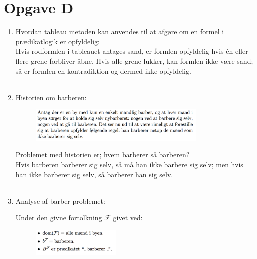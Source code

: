 \section*{Opgave D}

\begin{enumerate}
    \item Hvordan tableau metoden kan anvendes til at afgøre om en formel i prædikatlogik er opfyldelig: \\
    
    Hvis rodformlen i tableauet antages sand, er formlen opfyldelig hvis én eller flere grene forbliver åbne. Hvis alle grene lukker, kan formlen ikke være sand; så er formlen en kontradiktion og dermed ikke opfyldelig.\\
    \\
    
    \item Historien om barberen:
    
    \begin{figure}[H]
        \centering
        \includegraphics[width=0.8\textwidth]{opgD/barber.png}
        \label{fig:barber}
    \end{figure}
    
    Problemet med historien er; hvem barberer så barberen? \\
    Hvis barberen barberer sig selv, så må han ikke barbere sig selv; men hvis han ikke barberer sig selv, så barberer han sig selv.\\
    \\
    
    \item Analyse af barber problemet:
    
    Under den givne fortolkning $\mathcal{F}$ givet ved:
    
    \begin{figure}[H]
        \hspace{7 mm}
        \includegraphics[width=0.4\textwidth]{opgD/barbFort.png}
        \label{fig:barbFort}
    \end{figure}
    

\end{enumerate}
